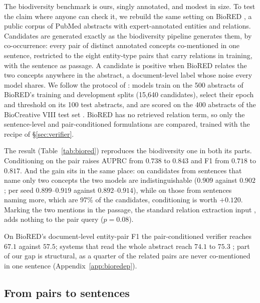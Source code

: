 \documentclass[11pt]{article}
\begin{document}
The biodiversity benchmark is ours, singly annotated, and modest in size. To test the claim where
anyone can check it, we rebuild the same setting on BioRED \citep{luo2022biored}, a public corpus
of PubMed abstracts with expert-annotated entities and relations. Candidates are generated exactly
as the biodiversity pipeline generates them, by co-occurrence: every pair of distinct annotated
concepts co-mentioned in one sentence, restricted to the eight entity-type pairs that carry
relations in training, with the sentence as passage. A candidate is positive when BioRED relates
the two concepts anywhere in the abstract, a document-level label whose noise every model shares.
We follow the protocol of \citet{lai2025bioredirect}: models train on the 500 abstracts of BioRED's
training and development splits (15{,}640 candidates), select their epoch and threshold on its 100
test abstracts, and are scored on the 400 abstracts of the BioCreative VIII test set
\citep{islamaj2024overview}. BioRED has no retrieved relation term, so only the sentence-level
and pair-conditioned formulations are compared, trained with the recipe of \S\ref{sec:verifier}.

The result (Table~\ref{tab:biored}) reproduces the biodiversity one in both its parts.
Conditioning on the pair raises AUPRC from $0.738$ to $0.843$ and F1 from $0.718$ to $0.817$. And
the gain sits in the same place: on candidates from sentences that name only two concepts the two
models are indistinguishable ($0.909$ against $0.902$; per seed $0.899$--$0.919$ against
$0.892$--$0.914$), while on those from sentences naming more, which are 97\% of the candidates,
conditioning is worth $+0.120$. Marking the two mentions in the passage, the standard relation
extraction input \citep{zhou2022improved}, adds nothing to the pair query ($p = 0.08$). 

On BioRED's document-level entity-pair F1 the pair-conditioned verifier reaches $67.1$ against
$57.5$; systems that read the whole abstract reach $74.1$ to $75.3$
\citep{lai2023biorex,lai2025bioredirect}; part of our gap is structural, as a quarter of the related pairs are never co-mentioned in one sentence (Appendix~\ref{app:bioredep}).

\subsection{From pairs to sentences}
\label{sec:sentence}
\end{document}
